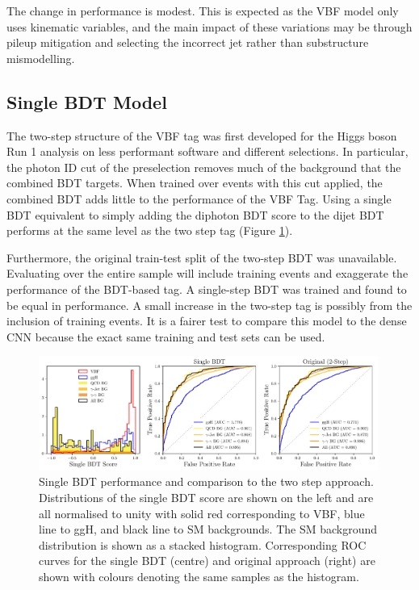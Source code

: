 The change in performance is modest. This is expected as the VBF model only uses kinematic variables, and the main impact of these variations may be through pileup mitigation and selecting the incorrect jet rather than substructure mismodelling. 


\subsection{Single BDT Model}
The two-step structure of the VBF tag was first developed for the Higgs boson Run 1 analysis  on less performant software and different selections. 
In particular, the photon ID cut of the preselection removes much of the background that the combined BDT targets. 
When trained over events with this cut applied, the combined BDT adds little to the performance of the VBF Tag. 
Using a single BDT equivalent to simply adding the diphoton BDT score to the dijet BDT performs at the same level as the two step tag (Figure \ref{fig:event_categorisation:single_BDT}).

Furthermore, the original train-test split of the two-step BDT was unavailable. Evaluating over the entire sample will include training events and exaggerate the performance of the BDT-based tag. 
A single-step BDT was trained and found to be equal in performance. A small increase in the two-step tag is possibly from the inclusion of training events. 
It is a fairer test to compare this model to the dense CNN because the exact same training and test sets can be used. 
\begin{figure}[h!]
    \centering
    \includegraphics[width=0.99\textwidth]{figures/event_selection/dijet_BDT_PS_unw.pdf}
    \caption{Single BDT performance and comparison to the two step approach. Distributions of the single BDT score are shown on the left and are all normalised to unity with solid red corresponding to VBF, blue line to ggH, and black line to SM backgrounds. The SM background distribution is shown as a stacked histogram. Corresponding ROC curves for the single BDT (centre) and original approach (right) are shown with colours denoting the same samples as the histogram.}
    \label{fig:event_categorisation:single_BDT}
\end{figure}

















